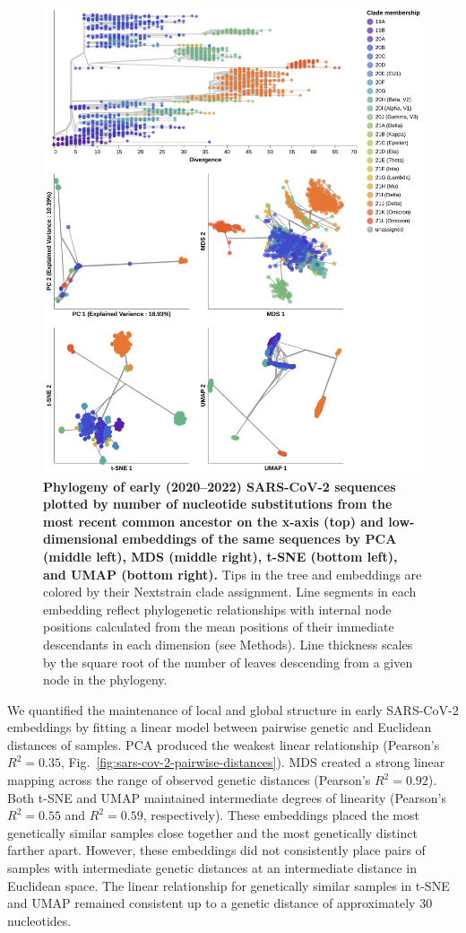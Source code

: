 \documentclass[webpdf,contemporary,large,single]{oup-authoring-template}%
\theoremstyle{thmstyleone}%
\theoremstyle{thmstyletwo}%
\theoremstyle{thmstylethree}%
\begin{document}
\begin{figure}[!h]
\includegraphics[width=0.9\columnwidth]{figures/sarscov2-embeddings-by-Nextstrain_clade-clade.png}
\caption{{\bf Phylogeny of early (2020--2022) SARS-CoV-2 sequences plotted by number of nucleotide substitutions from the most recent common ancestor on the x-axis (top) and low-dimensional embeddings of the same sequences by PCA (middle left), MDS (middle right), t-SNE (bottom left), and UMAP (bottom right).}
  Tips in the tree and embeddings are colored by their Nextstrain clade assignment.
  Line segments in each embedding reflect phylogenetic relationships with internal node positions calculated from the mean positions of their immediate descendants in each dimension (see Methods).
  Line thickness scales by the square root of the number of leaves descending from a given node in the phylogeny.
}
\label{fig:sars-cov-2-early-embeddings-by-Nextstrain-clade}
\end{figure}

We quantified the maintenance of local and global structure in early SARS-CoV-2 embeddings by fitting a linear model between pairwise genetic and Euclidean distances of samples.
PCA produced the weakest linear relationship (Pearson's $R^{2}=0.35$, Fig.~\ref{fig:sars-cov-2-pairwise-distances}).
MDS created a strong linear mapping across the range of observed genetic distances (Pearson's $R^{2}=0.92$).
Both t-SNE and UMAP maintained intermediate degrees of linearity (Pearson's $R^{2}=0.55$ and $R^{2}=0.59$, respectively).
These embeddings placed the most genetically similar samples close together and the most genetically distinct farther apart.
However, these embeddings did not consistently place pairs of samples with intermediate genetic distances at an intermediate distance in Euclidean space.
The linear relationship for genetically similar samples in t-SNE and UMAP remained consistent up to a genetic distance of approximately 30 nucleotides.
\end{document}
